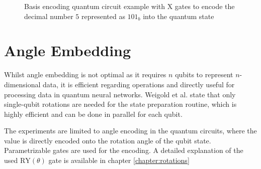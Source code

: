\begin{figure}[!h]
    \centering
    \caption{Basis encoding quantum circuit example with $\mathrm{X}$ gates to encode the decimal number $5$ represented as $101_b$ into the quantum state}
    \label{fig:basis_embedding_example}
\end{figure}

\section{Angle Embedding}\label{section:angle_embedding}

Whilst angle embedding is not optimal as it requires $n$ qubits to represent $n$-dimensional data, it is efficient regarding operations and directly useful for processing data in quantum neural networks\cite{Weigold2021_ExpandingDataEncodingPatterns,leymannBitterTruthGatebased2020}. Weigold et al. state that only single-qubit rotations are needed for the state preparation routine, which is highly efficient and can be done in parallel for each qubit. \par
The experiments are limited to angle encoding in the quantum circuits, where the value is directly encoded onto the rotation angle of the qubit state. Parametrizable gates\cite{qiskit_rygate_nodate} are used for the encoding. A detailed explanation of the used $\mathrm{RY}(\theta)$ gate is available in chapter \ref{chapter:rotations} \par
 
